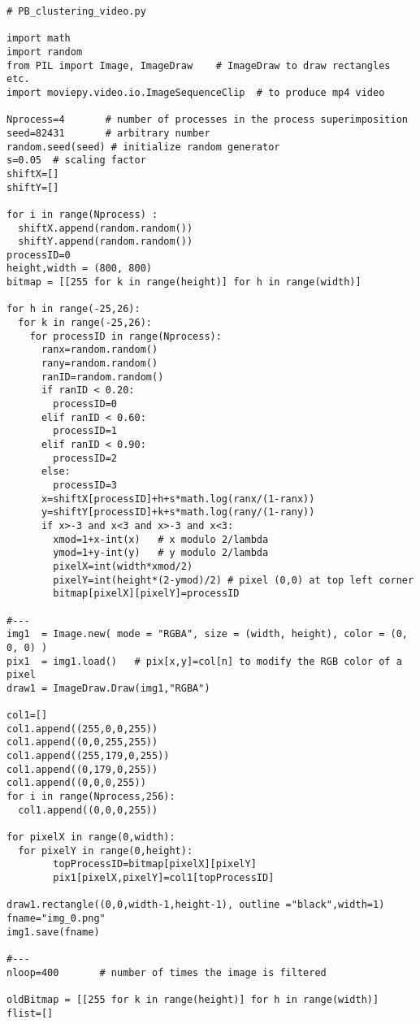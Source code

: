 \documentclass[oneside,10pt]{book}
\begin{document}
\begin{lstlisting}
# PB_clustering_video.py

import math
import random
from PIL import Image, ImageDraw    # ImageDraw to draw rectangles etc.
import moviepy.video.io.ImageSequenceClip  # to produce mp4 video

Nprocess=4       # number of processes in the process superimposition
seed=82431       # arbitrary number
random.seed(seed) # initialize random generator
s=0.05  # scaling factor
shiftX=[]
shiftY=[]

for i in range(Nprocess) :
  shiftX.append(random.random())
  shiftY.append(random.random())
processID=0
height,width = (800, 800)
bitmap = [[255 for k in range(height)] for h in range(width)]

for h in range(-25,26):
  for k in range(-25,26):
    for processID in range(Nprocess):
      ranx=random.random()
      rany=random.random()
      ranID=random.random()
      if ranID < 0.20:
        processID=0
      elif ranID < 0.60:
        processID=1
      elif ranID < 0.90:
        processID=2
      else:
        processID=3
      x=shiftX[processID]+h+s*math.log(ranx/(1-ranx))
      y=shiftY[processID]+k+s*math.log(rany/(1-rany))
      if x>-3 and x<3 and x>-3 and x<3:
        xmod=1+x-int(x)   # x modulo 2/lambda
        ymod=1+y-int(y)   # y modulo 2/lambda
        pixelX=int(width*xmod/2)
        pixelY=int(height*(2-ymod)/2) # pixel (0,0) at top left corner
        bitmap[pixelX][pixelY]=processID

#---
img1  = Image.new( mode = "RGBA", size = (width, height), color = (0, 0, 0) )
pix1  = img1.load()   # pix[x,y]=col[n] to modify the RGB color of a pixel
draw1 = ImageDraw.Draw(img1,"RGBA")

col1=[]
col1.append((255,0,0,255))
col1.append((0,0,255,255))
col1.append((255,179,0,255))
col1.append((0,179,0,255))
col1.append((0,0,0,255))
for i in range(Nprocess,256):
  col1.append((0,0,0,255))

for pixelX in range(0,width):
  for pixelY in range(0,height):
        topProcessID=bitmap[pixelX][pixelY]
        pix1[pixelX,pixelY]=col1[topProcessID]

draw1.rectangle((0,0,width-1,height-1), outline ="black",width=1)
fname="img_0.png"
img1.save(fname)

#---
nloop=400       # number of times the image is filtered

oldBitmap = [[255 for k in range(height)] for h in range(width)]
flist=[]


\end{lstlisting}
\end{document}
